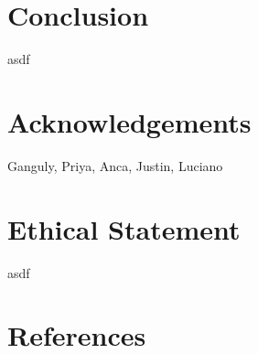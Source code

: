 \documentclass[12pt]{iopart}
\begin{document}
\section{Conclusion}
asdf

\section{Acknowledgements}
Ganguly, Priya, Anca, Justin, Luciano

\section{Ethical Statement}
asdf

\section{References}


\end{document}
